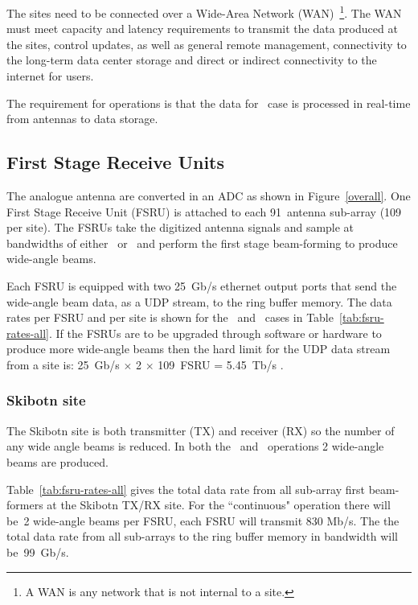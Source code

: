 \documentclass[12pt,a4paper]{article}
\begin{document}
The \ED sites need to be connected over a Wide-Area Network (WAN)~\footnote{A WAN is any network that is not internal to a site.}.
The WAN must meet capacity and latency requirements to transmit the data produced at the \ED sites, control updates, as well as general remote management, connectivity to the long-term data center storage and direct or indirect connectivity to the internet for users.

The requirement for \ED operations is that the data for \NBW\ case is processed in real-time from antennas to data storage.

\subsection{First Stage Receive Units}
\label{ssec:fsru}
The analogue antenna are converted in an ADC as shown in Figure~\ref{overall}.
One First Stage Receive Unit (FSRU) is attached to each 91~antenna sub-array (109 per site).
The FSRUs take the digitized antenna signals and sample at bandwidths of either \NBW\ or \WBW\ and perform the first stage beam-forming to produce wide-angle beams.

Each FSRU is equipped with two 25~Gb/s ethernet output ports that send the wide-angle beam data, as a UDP stream, to the ring buffer memory.
The data rates per FSRU and per site is shown for the \NBW\ and \WBW\ cases in Table~\ref{tab:fsru-rates-all}.
If the FSRUs are to be upgraded through software or hardware to produce more wide-angle beams then the hard limit for the UDP data stream from a site is: 
25~Gb/s $\times$ 2 $\times$ 109~FSRU = 5.45~Tb/s
.

\subsubsection{Skibotn site}
The Skibotn site is both transmitter (TX) and receiver (RX) so the number of any wide angle beams is reduced.
In both the \NBW\ and \WBW\ operations 2 wide-angle beams are produced.

Table~\ref{tab:fsru-rates-all} gives the total data rate from all sub-array first beam-formers at the Skibotn TX/RX site.
For the \NBW{} ``continuous" operation there will be~2 wide-angle beams per FSRU,  each FSRU will transmit 830 Mb/s.
The the total data rate from all sub-arrays to the ring buffer memory in \NBW{} bandwidth will be~99~Gb/s.
\end{document}
